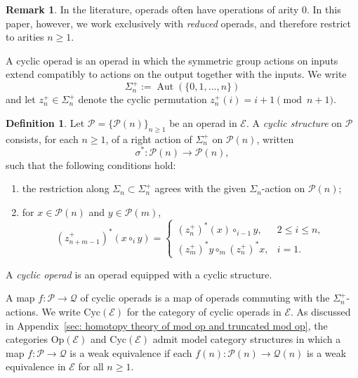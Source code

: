 \documentclass{amsart}
\newcommand{\bE}{\mathscr{E}}
\newcommand{\calQ}{\mathcal{Q}}
\newcommand{\calP}{\mathcal{P}}
\newcommand{\Cyc}{\mathrm{Cyc}}
\newcommand{\Op}{\mathrm{Op}}
\newcommand{\Aut}{\operatorname{Aut}}
\theoremstyle{definition}
\newtheorem{definition}[theorem]{Definition}%
\newtheorem{remark}[theorem]{Remark}%
\numberwithin{equation}{section}
\begin{document}
\begin{remark}
In the literature, operads often have operations of arity $0$. In this paper, however, we work exclusively with \emph{reduced} operads, and therefore restrict to arities $n\ge 1$.
\end{remark}

\medskip 

A cyclic operad is an operad in which the symmetric group actions on inputs extend compatibly to actions on the output together with the inputs. We write
\[
\Sigma_n^+ := \Aut(\{0,1,\ldots,n\})
\]
and let $z_n^+\in\Sigma_n^+$ denote the cyclic permutation $z_n^+(i)=i+1\pmod{n+1}$.

\begin{definition}\label{def: cyclic structure}
Let $\calP=\{\calP(n)\}_{n\ge 1}$ be an operad in $\bE$. A \emph{cyclic structure} on $\calP$ consists, for each $n\ge 1$, of a right action of
$\Sigma_n^+$ on $\calP(n)$, written
\[
\sigma^*:\calP(n)\to \calP(n),
\]
such that the following conditions hold:
\begin{enumerate}
\item the restriction along $\Sigma_n\subset \Sigma_n^+$ agrees with the given $\Sigma_n$-action on $\calP(n)$;

\item for $x\in\calP(n)$ and $y\in\calP(m)$,
\[
(z_{n+m-1}^+)^*(x\circ_i y)=
\begin{cases}
(z_n^+)^*(x)\circ_{i-1} y, & 2\le i\le n,\\[2pt] (z_m^+)^*y\circ_m (z_n^+)^*x, & i=1.
\end{cases}
\]
\end{enumerate}
A \emph{cyclic operad} is an operad equipped with a cyclic structure.
\end{definition}

A map $f:\calP\to\calQ$ of cyclic operads is a map of operads commuting with the $\Sigma_n^+$-actions. We write $\Cyc(\bE)$ for the category of cyclic operads in $\bE$. As discussed in Appendix~\ref{sec: homotopy theory of mod op and truncated mod op}, the categories $\Op(\bE)$ and $\Cyc(\bE)$ admit model category structures in which a map $f:\calP\to\calQ$ is a weak equivalence if each $f(n):\calP(n)\to\calQ(n)$ is a weak equivalence in $\bE$ for all $n\ge 1$.
\end{document}
